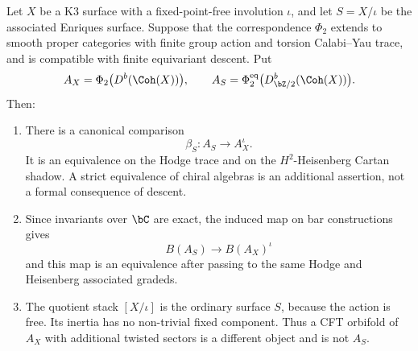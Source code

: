 \begin{conjecture}
\label{conj:phi-enriques-z2-orbifold}
\ClaimStatusConjectured
Let $X$ be a K3 surface with a fixed-point-free involution $\iota$, and let $S = X/\iota$ be the associated Enriques surface.  Suppose that the correspondence $\Phi_2$ extends to smooth proper categories with finite group action and torsion Calabi--Yau trace, and is compatible with finite equivariant descent.  Put
\[
 A_X=\Phi_2\bigl(D^b(\Coh(X))\bigr),
 \qquad
 A_S=\Phi_2^{\mathrm{eq}}\bigl(D^b_{\bZ/2}(\Coh(X))\bigr).
\]
Then:
\begin{enumerate}[label=\textup{(\roman*)}]
 \item There is a canonical comparison
 \[
 \beta_S\colon A_S \longrightarrow A_X^{\iota}.
 \]
 It is an equivalence on the Hodge trace and on the $H^2$-Heisenberg Cartan shadow.  A strict equivalence of chiral algebras is an additional assertion, not a formal consequence of descent.
 \item Since invariants over $\bC$ are exact, the induced map on bar constructions gives
 \[
 B(A_S) \longrightarrow B(A_X)^{\iota}
 \]
 and this map is an equivalence after passing to the same Hodge and Heisenberg associated gradeds.
 \item The quotient stack $[X/\iota]$ is the ordinary surface $S$, because the action is free.  Its inertia has no non-trivial fixed component.  Thus a CFT orbifold of $A_X$ with additional twisted sectors is a different object and is not $A_S$.
\end{enumerate}
\end{conjecture}

